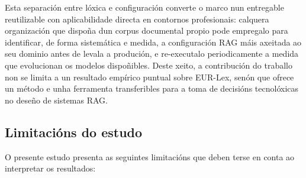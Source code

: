 \documentclass[11pt, a4paper, oneside]{report}
\begin{document}
Esta separación entre lóxica e configuración converte o marco nun entregable reutilizable
con aplicabilidade directa en contornos profesionais: calquera organización que dispoña
dun corpus documental propio pode empregalo para identificar, de forma sistemática e
medida, a configuración RAG máis axeitada ao seu dominio antes de levala a produción, e
re-executalo periodicamente a medida que evolucionan os modelos dispoñibles. Deste xeito,
a contribución do traballo non se limita a un resultado empírico puntual sobre EUR-Lex,
senón que ofrece un método e unha ferramenta transferibles para a toma de decisións
tecnolóxicas no deseño de sistemas RAG.

\subsection*{Limitacións do estudo}

O presente estudo presenta as seguintes limitacións que deben terse en conta ao
interpretar os resultados:
\end{document}
